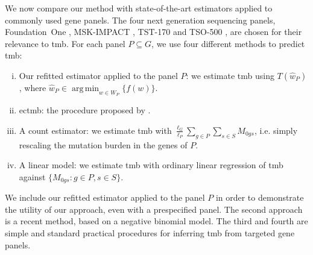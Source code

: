 \documentclass[12pt]{article}
\DeclareMathOperator*{\argmin}{arg\,min}
\begin{document}

We now compare our method with state-of-the-art estimators applied to commonly used gene panels. The four next generation sequencing panels, Foundation~One \citep{frampton_development_2013}, MSK-IMPACT \citep{cheng_memorial_2015}, TST-170 \citep{heydt_evaluation_2018} and TSO-500 \citep{pestinger_use_2020}, are chosen for their relevance to \acrshort{tmb}. For each panel $P \subseteq G$, we use four different methods to predict \acrshort{tmb}:
\begin{enumerate}[(i)]
 \item Our refitted estimator applied to the panel $P$: we estimate \acrshort{tmb} using $T(\hat{w}_P)$, where $\hat{w}_P \in \argmin_{w \in W_P} \{f(w)\}$. 
 \item \acrshort{ectmb}: the procedure proposed by \citet{yao_ectmb_2020}.
 \item A count estimator: we estimate \acrshort{tmb} with $\frac{\ell_G}{\ell_P} \sum_{g \in P} \sum_{s \in S}M_{0gs}$, i.e. simply rescaling the mutation burden in the genes of $P$. 
 \item A linear model: we estimate \acrshort{tmb} with ordinary linear regression of \acrshort{tmb} against $\{M_{0gs}: g \in P, s \in S\}$.
\end{enumerate}
We include our refitted estimator applied to the panel $P$ in order to demonstrate the utility of our approach, even with a prespecified panel. The second approach is a recent method, based on a negative binomial model. The third and fourth are simple and standard practical procedures for inferring \acrshort{tmb} from targeted gene panels. 
\end{document}

